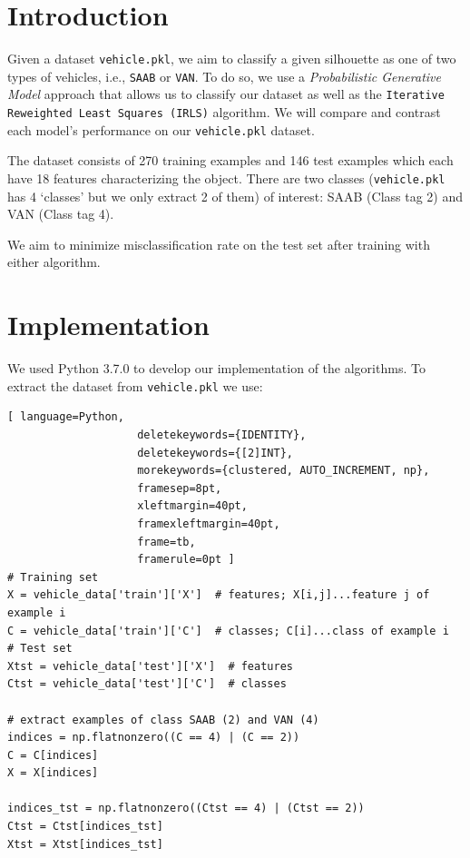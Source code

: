 \documentclass[a4paper,11pt,oneside]{article}
\begin{document}
  \newpage
  \tableofcontents

  \clearpage

\section{Introduction}
  Given a dataset \texttt{vehicle.pkl}, we aim to classify a given silhouette as one of two types of vehicles, i.e., \texttt{SAAB} or \texttt{VAN}. To do so, we use a \textit{Probabilistic Generative Model} approach that allows us to classify our dataset as well as the \texttt{Iterative Reweighted Least Squares (IRLS)} algorithm. We will compare and contrast each model's performance on our \texttt{vehicle.pkl} dataset.

The dataset consists of 270 training examples and 146 test examples which each have 18 features characterizing the object. There are two classes (\texttt{vehicle.pkl} has 4 `classes' but we only extract 2 of them) of interest: SAAB (Class tag 2) and VAN (Class tag 4).

We aim to minimize misclassification rate on the test set after training with either algorithm.

\newpage

\section{Implementation}

We used Python 3.7.0 to develop our implementation of the algorithms. To extract the dataset from \texttt{vehicle.pkl} we use:
\begin{lstlisting}[ language=Python,
                    deletekeywords={IDENTITY},
                    deletekeywords={[2]INT},
                    morekeywords={clustered, AUTO_INCREMENT, np},
                    framesep=8pt,
                    xleftmargin=40pt,
                    framexleftmargin=40pt,
                    frame=tb,
                    framerule=0pt ]
# Training set
X = vehicle_data['train']['X']  # features; X[i,j]...feature j of example i
C = vehicle_data['train']['C']  # classes; C[i]...class of example i
# Test set
Xtst = vehicle_data['test']['X']  # features
Ctst = vehicle_data['test']['C']  # classes

# extract examples of class SAAB (2) and VAN (4)
indices = np.flatnonzero((C == 4) | (C == 2))
C = C[indices]
X = X[indices]

indices_tst = np.flatnonzero((Ctst == 4) | (Ctst == 2))
Ctst = Ctst[indices_tst]
Xtst = Xtst[indices_tst]
\end{lstlisting}
\end{document}
